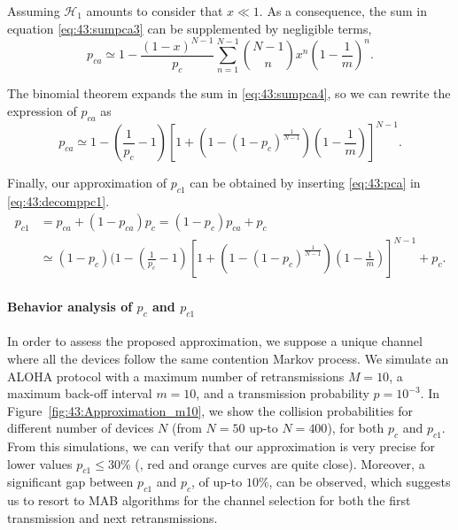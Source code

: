 Assuming $\mathcal{H}_{1}$ amounts to consider that $x\ll 1$. As a consequence, the sum in equation \eqref{eq:43:sumpca3} can be supplemented by negligible terms,
%
\begin{equation}\label{eq:43:sumpca4}
	p_{ca} \simeq  1 - \frac{\left(1-x\right)^{N-1}}{p_c}\sum_{n=1}^{N-1}{N-1 \choose n} x^n \left( 1-\frac{1}{m}\right)^n.
\end{equation}

The binomial theorem expands the sum in \eqref{eq:43:sumpca4}, so we can rewrite the expression of $p_{ca}$ as
%
\begin{equation}\label{eq:43:pca}
	p_{ca} \simeq 1 - \left(\frac{1}{p_c}-1\right)\left[ 1+\left(1-\left(1-p_c\right)^{\frac{1}{N-1}}\right)\left(1-\frac{1}{m}\right)\right]^{N-1}.
\end{equation}

Finally, our approximation of $p_{c1}$ can be obtained by inserting \eqref{eq:43:pca} in \eqref{eq:43:decomppc1}.
%
\begin{align}\label{eq:43:final_expression_pc1}
	p_{c1} &= p_{ca}+\left(1-p_{ca}\right)p_c = (1 - p_c) p_{ca} + p_c \nonumber \\
	&\simeq \left(1 - p_c\right) (1 - \left(\frac{1}{p_c}-1\right)\left[ 1+\left(1-\left(1-p_c\right)^{\frac{1}{N-1}}\right)\left(1-\frac{1}{m}\right)\right]^{N-1} + p_c.
\end{align}


\paragraph{Behavior analysis of $p_{c}$ and $p_{c1}$}\label{sub:43:numericalValidationPC1PC}

In order to assess the proposed approximation, we suppose a unique channel where all the devices follow the same contention Markov process.
We simulate an ALOHA protocol with a maximum number of retransmissions $M=10$, a maximum back-off interval $m=10$, and a transmission probability $p=10^{-3}$.
%
In Figure~\ref{fig:43:Approximation_m10}, we show the collision probabilities for different number of devices $N$ (from $N=50$ up-to $N=400$), for both $p_{c}$ and $p_{c1}$.
%
From this simulations, we can verify that our approximation is very precise for lower values $p_{c1} \leq 30 \%$ (\ie, red and orange curves are quite close).
Moreover, a significant gap between $p_{c1}$ and $p_c$,
of up-to $10\%$, can be observed,
which suggests us to resort to MAB algorithms for the channel selection for both the first transmission and next retransmissions.

